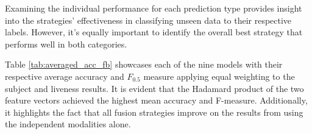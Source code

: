 \documentclass{mpaper}
\begin{document}
Examining the individual performance for each prediction type provides insight into the strategies' effectiveness in classifying unseen data to their respective labels. However, it's equally important to identify the overall best strategy that performs well in both categories.

Table \ref{tab:averaged_acc_fb} showcases each of the nine models with their respective average accuracy and $F_{0.5}$ measure applying equal weighting to the subject and liveness results. It is evident that the Hadamard product of the two feature vectors achieved the highest mean accuracy and F-measure. Additionally, it highlights the fact that all fusion strategies improve on the results from using the independent modalities alone.

\begin{table}[htbp]
    \centering
    \vspace{0.1cm}
    \caption{Averaged accuracy and $F_{0.5}$ score for the seven fusion strategies and individual modalities, applying equal weighting to subject and liveness predictions.}
    \label{tab:averaged_acc_fb}
    \vspace{-0.3cm}
\end{table}
\end{document}
